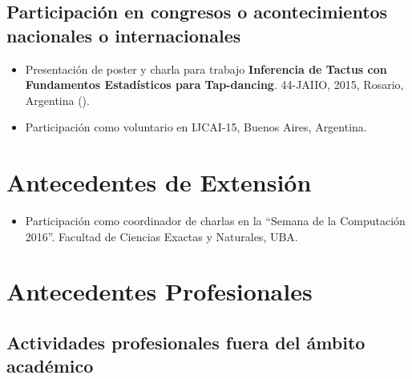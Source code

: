 \documentclass[a4paper,10pt]{article}
\begin{document}
\subsection{Participación en congresos o acontecimientos nacionales o
internacionales}

\begin{itemize}
    \item Presentación de poster y charla para trabajo 
\textbf{Inferencia de Tactus con Fundamentos Estadísticos para
Tap-dancing}.\enpublicados{}
        44-JAIIO, 2015, Rosario, Argentina ().
    \item Participación como voluntario en IJCAI-15, Buenos Aires, Argentina.
\end{itemize}

\section{Antecedentes de Extensión}

\begin{itemize}
    \item Participación como coordinador de charlas en la “Semana de la
        Computación 2016”. Facultad de Ciencias Exactas y Naturales, UBA. 
\end{itemize}

\section{Antecedentes Profesionales}

\subsection{Actividades profesionales fuera del ámbito académico}
\end{document}
